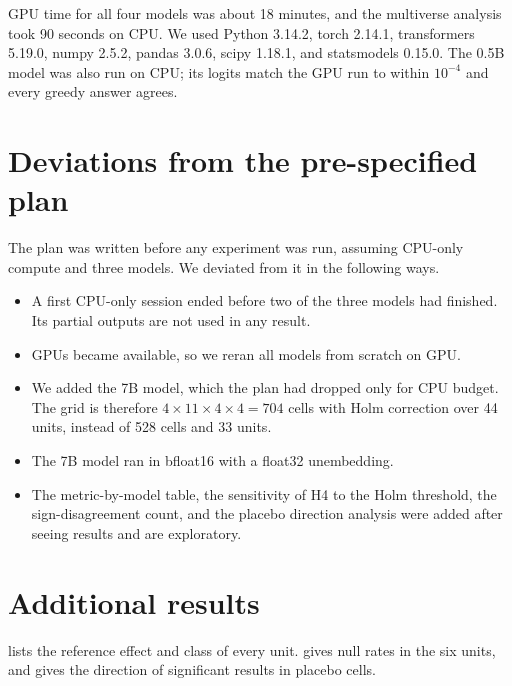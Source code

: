 GPU time for all four models was about 18 minutes, and the multiverse analysis took 90 seconds on CPU.
We used Python 3.14.2, torch 2.14.1, transformers 5.19.0, numpy 2.5.2, pandas 3.0.6, scipy 1.18.1, and statsmodels 0.15.0.
The 0.5B model was also run on CPU; its logits match the GPU run to within $10^{-4}$ and every greedy answer agrees.

\section{Deviations from the pre-specified plan}
\label{app:deviations}

The plan was written before any experiment was run, assuming CPU-only compute and three models.
We deviated from it in the following ways.
\begin{itemize}[leftmargin=*,itemsep=0pt,topsep=0pt]
    \item A first CPU-only session ended before two of the three models had finished. Its partial outputs are not used in any result.
    \item GPUs became available, so we reran all models from scratch on GPU.
    \item We added the 7B model, which the plan had dropped only for CPU budget. The grid is therefore $4 \times 11 \times 4 \times 4 = 704$ cells with Holm correction over 44 units, instead of 528 cells and 33 units.
    \item The 7B model ran in bfloat16 with a float32 unembedding.
    \item The metric-by-model table, the sensitivity of H4 to the Holm threshold, the sign-disagreement count, and the placebo direction analysis were added after seeing results and are exploratory.
\end{itemize}

\section{Additional results}
\label{app:additional}

 lists the reference effect and class of every unit.
 gives null rates in the six \noeff units, and  gives the direction of significant results in placebo cells.

